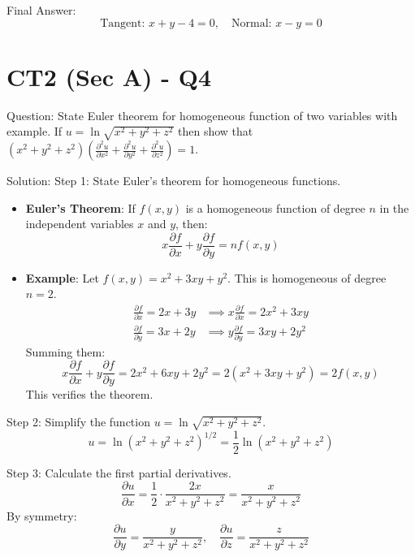 \documentclass{article}
\begin{document}
Final Answer:
\[
\boxed{\text{Tangent: } x + y - 4 = 0, \quad \text{Normal: } x - y = 0}
\]

\section*{CT2 (Sec A) - Q4}
Question:
State Euler theorem for homogeneous function of two variables with example. If $u = \ln\sqrt{x^2 + y^2 + z^2}$ then show that $(x^2 + y^2 + z^2)\left(\frac{\partial^2 u}{\partial x^2} + \frac{\partial^2 u}{\partial y^2} + \frac{\partial^2 u}{\partial z^2}\right) = 1$.

Solution:
Step 1: State Euler's theorem for homogeneous functions.
\begin{itemize}
    \item \textbf{Euler's Theorem}: If $f(x, y)$ is a homogeneous function of degree $n$ in the independent variables $x$ and $y$, then:
    \[
    x \frac{\partial f}{\partial x} + y \frac{\partial f}{\partial y} = n f(x, y)
    \]
    \item \textbf{Example}: Let $f(x, y) = x^2 + 3xy + y^2$. This is homogeneous of degree $n = 2$.
    \begin{align*}
        \frac{\partial f}{\partial x} = 2x + 3y &\implies x \frac{\partial f}{\partial x} = 2x^2 + 3xy \\
        \frac{\partial f}{\partial y} = 3x + 2y &\implies y \frac{\partial f}{\partial y} = 3xy + 2y^2
    \end{align*}
    Summing them:
    \[
    x \frac{\partial f}{\partial x} + y \frac{\partial f}{\partial y} = 2x^2 + 6xy + 2y^2 = 2(x^2 + 3xy + y^2) = 2 f(x, y)
    \]
    This verifies the theorem.
\end{itemize}

Step 2: Simplify the function $u = \ln\sqrt{x^2 + y^2 + z^2}$.
\[
u = \ln(x^2 + y^2 + z^2)^{1/2} = \frac{1}{2} \ln(x^2 + y^2 + z^2)
\]

Step 3: Calculate the first partial derivatives.
\[
\frac{\partial u}{\partial x} = \frac{1}{2} \cdot \frac{2x}{x^2 + y^2 + z^2} = \frac{x}{x^2 + y^2 + z^2}
\]
By symmetry:
\[
\frac{\partial u}{\partial y} = \frac{y}{x^2 + y^2 + z^2}, \quad \frac{\partial u}{\partial z} = \frac{z}{x^2 + y^2 + z^2}
\]
\end{document}
